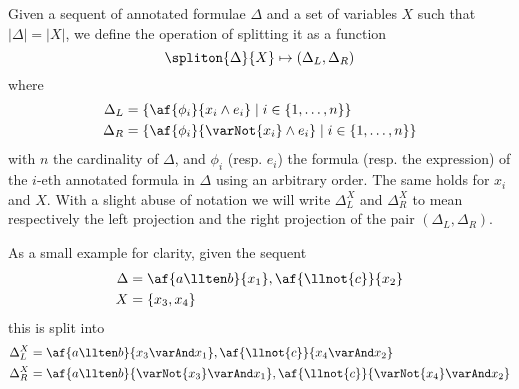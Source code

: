 \begin{define}[Splitting]
	\label{def:split}
	Given a sequent of annotated formulae $\Delta$ and a set of variables $X$ such that $|\Delta| = |X|$, we define the operation of splitting it as a function
	$$ \spliton{\Delta}{X} \mapsto (\Delta_L, \Delta_R) $$
	where
	\begin{align*}
		\Delta_L &= \{ \af{\phi_i}{x_i \wedge e_i} \mid i \in \{1, \dots, n\}\} \\
		\Delta_R &= \{ \af{\phi_i}{\varNot{x_i} \wedge e_i} \mid i \in \{1, \dots, n\}\}
	\end{align*}
	with $n$ the cardinality of $\Delta$, and $\phi_i$ (resp. $e_i$) the formula (resp. the expression) of the $i$-eth annotated formula in $\Delta$ using an arbitrary order.
	The same holds for $x_i$ and $X$.
	With a slight abuse of notation we will write $\Delta_L^X$ and $\Delta_R^X$ to mean respectively the left projection and the right projection of the pair $(\Delta_L, \Delta_R)$.
\end{define}
As a small example for clarity, given the sequent
\begin{align*}
	\Delta &= \af{a \llten b}{x_1}, \af{\llnot{c}}{x_2} \\
	X      &= \{ x_3, x_4 \} 
\end{align*}
this is split into
\begin{align*}
	\Delta_L^X &= \af{a \llten b}{x_3 \varAnd x_1}, \af{\llnot{c}}{x_4 \varAnd x_2} \\
	\Delta_R^X &= \af{a \llten b}{\varNot{x_3} \varAnd x_1}, \af{\llnot{c}}{\varNot{x_4} \varAnd x_2} 
\end{align*}



